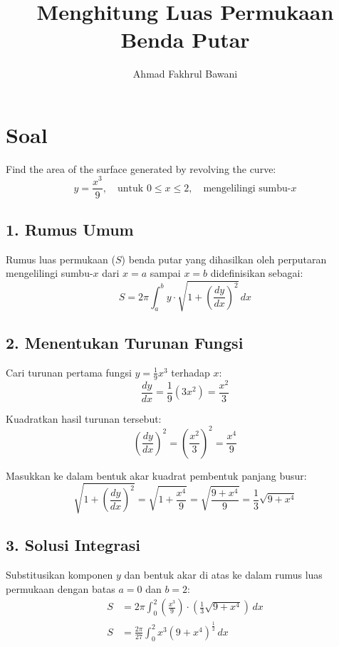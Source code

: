\documentclass[12pt,a4paper]{article}
\title{Menghitung Luas Permukaan Benda Putar}
\author{Ahmad Fakhrul Bawani}
\date{}
\begin{document}
\maketitle

\section*{Soal}

Find the area of the surface generated by revolving the curve:
\begin{equation*}
  y = \frac{x^3}{9}, \quad \text{untuk } 0 \le x \le 2, \quad \text{mengelilingi sumbu-}x
\end{equation*}

\subsection*{1. Rumus Umum}
Rumus luas permukaan ($S$) benda putar yang dihasilkan oleh perputaran mengelilingi sumbu-$x$ dari $x = a$ sampai $x = b$ didefinisikan sebagai:
\begin{equation*}
  S = 2\pi \int_{a}^{b} y \cdot \sqrt{1 + \left(\frac{dy}{dx}\right)^2} \, dx
\end{equation*}

\subsection*{2. Menentukan Turunan Fungsi}
Cari turunan pertama fungsi $y = \frac{1}{9}x^3$ terhadap $x$:
\begin{equation*}
  \frac{dy}{dx} = \frac{1}{9}(3x^2) = \frac{x^2}{3}
\end{equation*}

Kuadratkan hasil turunan tersebut:
\begin{equation*}
  \left(\frac{dy}{dx}\right)^2 = \left(\frac{x^2}{3}\right)^2 = \frac{x^4}{9}
\end{equation*}

Masukkan ke dalam bentuk akar kuadrat pembentuk panjang busur:
\begin{equation*}
  \sqrt{1 + \left(\frac{dy}{dx}\right)^2} = \sqrt{1 + \frac{x^4}{9}} = \sqrt{\frac{9 + x^4}{9}} = \frac{1}{3}\sqrt{9 + x^4}
\end{equation*}

\subsection*{3. Solusi Integrasi}
Substitusikan komponen $y$ dan bentuk akar di atas ke dalam rumus luas permukaan dengan batas $a = 0$ dan $b = 2$:
\begin{align*}
  S &= 2\pi \int_{0}^{2} \left(\frac{x^3}{9}\right) \cdot \left(\frac{1}{3}\sqrt{9 + x^4}\right) \, dx \\
  S &= \frac{2\pi}{27} \int_{0}^{2} x^3 (9 + x^4)^{\frac{1}{2}} \, dx
\end{align*}
\end{document}
